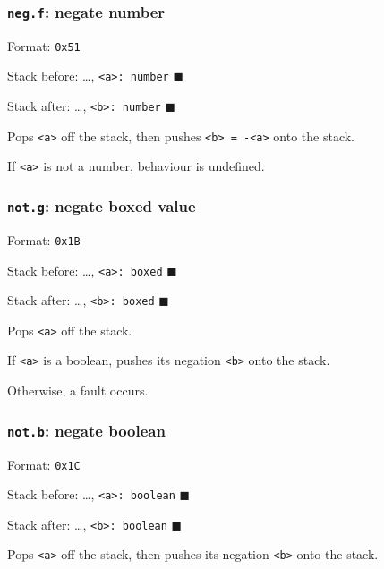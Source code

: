 \subsubsection{\texorpdfstring{\texttt{neg.f}: negate
number}{neg.f: negate number}}

Format: \texttt{0x51}

Stack before: \ldots, \texttt{\textless{}a\textgreater{}:\ number}
\(\blacksquare\)

Stack after: \ldots, \texttt{\textless{}b\textgreater{}:\ number}
\(\blacksquare\)

Pops \texttt{\textless{}a\textgreater{}} off the stack, then pushes
\texttt{\textless{}b\textgreater{}\ =\ -\textless{}a\textgreater{}} onto
the stack.

If \texttt{\textless{}a\textgreater{}} is not a number, behaviour is
undefined.

\subsubsection{\texorpdfstring{\texttt{not.g}: negate boxed
value}{not.g: negate boxed value}}

Format: \texttt{0x1B}

Stack before: \ldots, \texttt{\textless{}a\textgreater{}:\ boxed}
\(\blacksquare\)

Stack after: \ldots, \texttt{\textless{}b\textgreater{}:\ boxed}
\(\blacksquare\)

Pops \texttt{\textless{}a\textgreater{}} off the stack.

If \texttt{\textless{}a\textgreater{}} is a boolean, pushes its negation
\texttt{\textless{}b\textgreater{}} onto the stack.

Otherwise, a fault occurs.

\subsubsection{\texorpdfstring{\texttt{not.b}: negate
boolean}{not.b: negate boolean}}

Format: \texttt{0x1C}

Stack before: \ldots, \texttt{\textless{}a\textgreater{}:\ boolean}
\(\blacksquare\)

Stack after: \ldots, \texttt{\textless{}b\textgreater{}:\ boolean}
\(\blacksquare\)

Pops \texttt{\textless{}a\textgreater{}} off the stack, then pushes its
negation \texttt{\textless{}b\textgreater{}} onto the stack.


